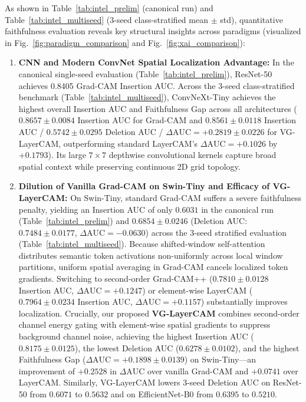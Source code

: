 \documentclass[final,5p,times,twocolumn]{elsarticle}
\begin{document}
As shown in Table~\ref{tab:intel_prelim} (canonical run) and Table~\ref{tab:intel_multiseed} (3-seed class-stratified mean $\pm$ std), quantitative faithfulness evaluation reveals key structural insights across paradigms (visualized in Fig.~\ref{fig:paradigm_comparison} and Fig.~\ref{fig:xai_comparison}):
\begin{enumerate}
    \item \textbf{CNN and Modern ConvNet Spatial Localization Advantage:} In the canonical single-seed evaluation (Table~\ref{tab:intel_prelim}), ResNet-50 achieves 0.8405 Grad-CAM Insertion AUC. Across the 3-seed class-stratified benchmark (Table~\ref{tab:intel_multiseed}), ConvNeXt-Tiny achieves the highest overall Insertion AUC and Faithfulness Gap across all architectures ($0.8657 \pm 0.0084$ Insertion AUC for Grad-CAM and $0.8561 \pm 0.0118$ Insertion AUC / $0.5742 \pm 0.0295$ Deletion AUC / $\Delta\text{AUC} = +0.2819 \pm 0.0226$ for VG-LayerCAM, outperforming standard LayerCAM's $\Delta\text{AUC} = +0.1026$ by $+0.1793$). Its large $7\times7$ depthwise convolutional kernels capture broad spatial context while preserving continuous 2D grid topology.
    \item \textbf{Dilution of Vanilla Grad-CAM on Swin-Tiny and Efficacy of VG-LayerCAM:} On Swin-Tiny, standard Grad-CAM suffers a severe faithfulness penalty, yielding an Insertion AUC of only $0.6031$ in the canonical run (Table~\ref{tab:intel_prelim}) and $0.6854 \pm 0.0246$ (Deletion AUC: $0.7484 \pm 0.0177$, $\Delta\text{AUC} = -0.0630$) across the 3-seed stratified evaluation (Table~\ref{tab:intel_multiseed}). Because shifted-window self-attention distributes semantic token activations non-uniformly across local window partitions, uniform spatial averaging in Grad-CAM cancels localized token gradients. Switching to second-order Grad-CAM++ ($0.7810 \pm 0.0128$ Insertion AUC, $\Delta\text{AUC} = +0.1247$) or element-wise LayerCAM ($0.7964 \pm 0.0234$ Insertion AUC, $\Delta\text{AUC} = +0.1157$) substantially improves localization. Crucially, our proposed \textbf{VG-LayerCAM} combines second-order channel energy gating with element-wise spatial gradients to suppress background channel noise, achieving the highest Insertion AUC ($0.8175 \pm 0.0125$), the lowest Deletion AUC ($0.6278 \pm 0.0102$), and the highest Faithfulness Gap ($\Delta\text{AUC} = +0.1898 \pm 0.0139$) on Swin-Tiny---an improvement of $+0.2528$ in $\Delta\text{AUC}$ over vanilla Grad-CAM and $+0.0741$ over LayerCAM. Similarly, VG-LayerCAM lowers 3-seed Deletion AUC on ResNet-50 from $0.6071$ to $0.5632$ and on EfficientNet-B0 from $0.6395$ to $0.5210$.
\end{enumerate}
\end{document}
